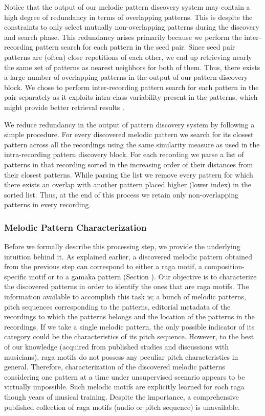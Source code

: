 Notice that the output of our melodic pattern discovery system may contain a high degree of redundancy in terms of overlapping patterns. This is despite the constraints to only select mutually non-overlapping patterns during the discovery and search phase. This redundancy arises primarily because we perform the inter-recording pattern search for each pattern in the seed pair. Since seed pair patterns are (often) close repetitions of each other, we end up retrieving nearly the same set of patterns as nearest neighbors for both of them. Thus, there exists a large number of overlapping patterns in the output of our pattern discovery block. We chose to perform inter-recording pattern search for each pattern in the pair separately as it exploits intra-class variability present in the patterns, which might provide better retrieval results . 

We reduce redundancy in the output of pattern discovery system by following a simple procedure. For every discovered melodic pattern we search for its closest pattern across all the recordings using the same similarity measure as used in the intra-recording pattern discovery block. For each recording we parse a list of patterns in that recording sorted in the increasing order of their distances from their closest patterns. While parsing the list we remove every pattern for which there exists an overlap with another pattern placed higher (lower index) in the sorted list. Thus, at the end of this process we retain only non-overlapping patterns in every recording.



\subsubsection{Melodic Pattern Characterization}
\label{pattern_characterization}

Before we formally describe this processing step, we provide the underlying intuition behind it. As explained earlier, a discovered melodic pattern obtained from the previous step can correspond to either a \gls{raga} motif, a composition-specific motif or to a \gls{gamaka} pattern (Section ). Our objective is to characterize the discovered patterns in order to identify the ones that are \gls{raga} motifs. The information available to accomplish this task is; a bunch of melodic patterns, pitch sequences corresponding to the patterns, editorial metadata of the recordings to which the patterns belongs and the location of the patterns in the recordings. If we take a single melodic pattern, the only possible indicator of its category could be the characteristics of its pitch sequence. However, to the best of our knowledge (acquired from published studies and discussions with musicians), \gls{raga} motifs do not possess any peculiar pitch characteristics in general. Therefore, characterization of the discovered melodic patterns considering one pattern at a time under unsupervised scenario appears to be virtually impossible. Such melodic motifs are explicitly learned for each \gls{raga} though years of musical training. Despite the importance, a comprehensive published collection of \gls{raga} motifs (audio or pitch sequence) is unavailable. 

